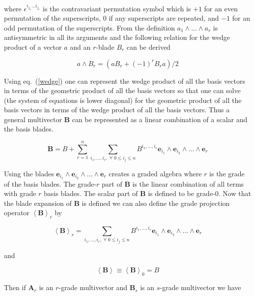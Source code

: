 \documentclass[12pt]{report}
\newcommand{\bm}[1]{\boldsymbol{#1}}
\newcommand{\llt}{\left <}
\newcommand{\rgt}{\right >}
\newcommand{\W}{\wedge}
\newcommand{\proj}[2]{\llt {#1} \rgt_{#2}}
\newcommand{\eb}{\bm{e}}
\begin{document}
where $\epsilon^{i_{j_{1}}\dots i_{j_{r}}}$ is the contravariant permutation symbol which is $+1$ for an even permutation of the
superscripts, $0$ if any superscripts are repeated, and $-1$ for an odd permutation of the superscripts. From the definition
$a_{1}\W\dots\W a_{r}$ is antisymmetric in all its arguments and the following relation for the wedge product of a vector $a$ and an
$r$-blade $B_{r}$ can be derived

   \begin{equation}\label{wedge}
      a\W B_{r} = (aB_{r}+(-1)^{r}B_{r}a)/2
   \end{equation}

Using eq.~(\ref{wedge}) one can represent the wedge product of all the basis vectors
in terms of the geometric product of all the basis vectors so that one can solve (the system
of equations is lower diagonal) for the geometric product of all the basis vectors in terms of
the wedge product of all the basis vectors.  Thus a general multivector $\bm{B}$ can be
represented as a linear combination of a scalar and the basis blades.

   \begin{equation}
      \bm{B} = B + \sum_{r=1}^{n}\sum_{i_{1},\dots,i_{r},\;\forall\; 0\le i_{j} \le n} B^{i_{1},\dots,i_{r}}\eb_{i_{1}}\W \eb_{i_{2}}\W\dots\W \eb_{r}
   \end{equation}

Using the blades $\eb_{i_{1}}\W \eb_{i_{2}}\W\dots\W \eb_{r}$ creates a graded
algebra where $r$ is the grade of the basis blades.  The grade-$r$
part of $\bm{B}$ is the linear combination of all terms with
grade $r$ basis blades. The scalar part of $\bm{B}$ is defined to
be grade-$0$.  Now that the blade expansion of $\bm{B}$ is defined
we can also define the grade projection operator $\proj{\bm{B}}{r}$ by

   \begin{equation}
      \proj{\bm{B}}{r} = \sum_{i_{1},\dots,i_{r},\;\forall\; 0\le i_{j} \le n} B^{i_{1},\dots,i_{r}}\eb_{i_{1}}\W \eb_{i_{2}}\W\dots\W \eb_{r}
   \end{equation}

and

   \begin{equation}
      \proj{\bm{B}}{} \equiv \proj{\bm{B}}{0} = B
   \end{equation}

Then if $\bm{A}_{r}$ is an $r$-grade multivector and $\bm{B}_{s}$ is an $s$-grade multivector we have
\end{document}
